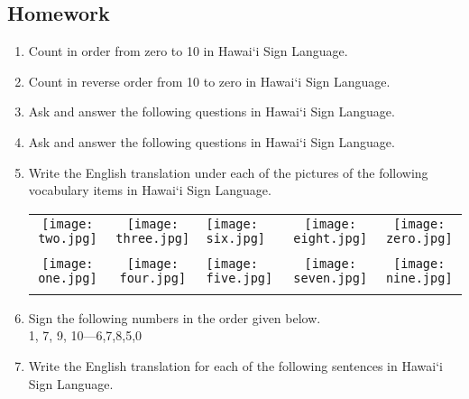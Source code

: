 \documentclass{tufte-book}
\begin{document}
\subsection{Homework}
\begin{enumerate}
\item Count in order from zero to 10 in Hawai`i Sign Language.
\item Count in reverse order from 10 to zero in Hawai`i Sign Language.
\item Ask and answer the following questions in Hawai`i Sign Language.
\item Ask and answer the following questions in Hawai`i Sign Language.
\item Write the English translation under each of the pictures of the following vocabulary items in Hawai`i Sign Language.
\begin{table*}[h!]
\begin{tabular}{c c l c c}
\texttt{[image: two.jpg]} & \texttt{[image: three.jpg]} & \texttt{[image: six.jpg]} & \texttt{[image: eight.jpg]} & \texttt{[image: zero.jpg]}\\
& & & & \\
\texttt{[image: one.jpg]} & \texttt{[image: four.jpg]} & \texttt{[image: five.jpg]} & \texttt{[image: seven.jpg]} & \texttt{[image: nine.jpg]}\\
& & & & \\

\end{tabular}
\end{table*}

\item Sign the following numbers in the order given below.\\ 1, 7, 9, 10—6,7,8,5,0
\item Write the English translation for each of the following sentences in Hawai`i Sign Language.
\end{enumerate}
\end{document}

